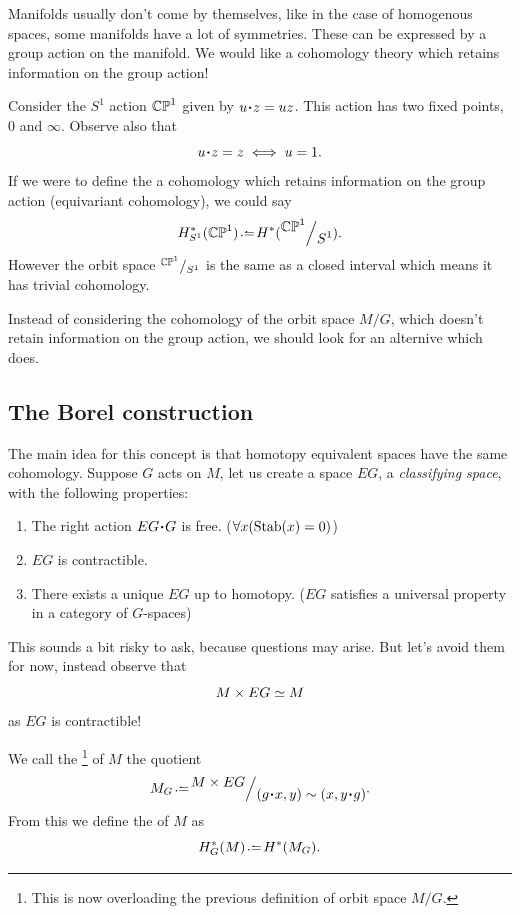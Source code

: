 \documentclass[12pt]{memoir}
\begin{document}
Manifolds usually don't come by themselves, like in the case of homogenous spaces, some manifolds have a lot of symmetries. These can be expressed by a group action on the manifold. We would like a cohomology theory which retains information on the group action!

\begin{Ex}
    Consider the $S^1$ action $\mathbb{CP}^1$ given by $u\. z=uz$. This action has two fixed points, $0$ and $\infty$. Observe also that 
    $$u\.z=z\iff u=1.$$
    If we were to define the a cohomology which retains information on the group action (equivariant cohomology), we could say 
    $$H_{S^1}^\ast(\bCP^1)\defeq H^\ast(\quot{\bCP^1}{S^1}).$$
    However the orbit space $\quot{\bCP^1}{S^1}$ is the same as a closed interval which means it has trivial cohomology.
\end{Ex}

Instead of considering the cohomology of the orbit space $M/G$, which doesn't retain information on the group action, we should look for an alternive which does.

\subsection{The Borel construction}

The main idea for this concept is that homotopy equivalent spaces have the same cohomology. Suppose $G$ acts on $M$, let us create a space $EG$, a \emph{classifying space}, with the following properties:

\begin{enumerate}
    \item The right action $EG\. G$ is free. ($\forall x(\operatorname{Stab}(x)=0)$)
    \item $EG$ is contractible. 
    \item There exists a unique $EG$ up to homotopy. ($EG$ satisfies a universal property in a category of $G$-spaces)
\end{enumerate}

This sounds a bit risky to ask, because questions may arise. But let's avoid them for now, instead observe that 
$$M\times EG\simeq M$$
as $EG$ is contractible! 

\begin{Def}
    We call the \footnote{This is now overloading the previous definition of orbit space $M/G$.} of $M$ the quotient
    $$M_G\defeq\quot{M\x EG}{(g\.x,y)\sim(x,y\.g)}.$$
    From this we define the  of $M$ as 
    $$H_G^\ast(M)\defeq H^\ast(M_G).$$
\end{Def}
\end{document}
